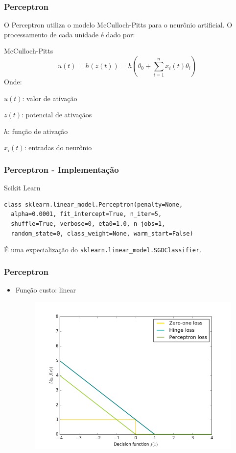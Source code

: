 \documentclass{beamer}
\begin{document}
\begin{frame}
\frametitle{Perceptron}
O Perceptron utiliza o modelo McCulloch-Pitts para o neurônio artificial. O processamento de cada unidade é dado por:
\begin{block}{McCulloch-Pitts}
\[ u(t) = h(z(t)) = h \left( \theta_0 + \sum_{i=1}^n x_i(t) \theta_i \right) \]
Onde:

$u(t)$: valor de ativação

$z(t)$: potencial de ativaçãos

$h$: função de ativação
  
$x_i(t)$: entradas do neurônio
\end{block}
\end{frame}

\begin{frame}[fragile] %
\frametitle{Perceptron - Implementação}
\begin{block}{Scikit Learn}
\begin{verbatim}
class sklearn.linear_model.Perceptron(penalty=None, 
  alpha=0.0001, fit_intercept=True, n_iter=5, 
  shuffle=True, verbose=0, eta0=1.0, n_jobs=1, 
  random_state=0, class_weight=None, warm_start=False)
\end{verbatim}
\end{block}
É uma expecialização do \verb|sklearn.linear_model.SGDClassifier|.
\end{frame}

\begin{frame}
\frametitle{Perceptron}
\begin{itemize}
\item Função custo: linear

\begin{figure}[H]
\centering
  \includegraphics[width=0.8\linewidth]{../img/loss_function.png}
  \label{fig:percep}
\end{figure}%


\end{itemize}
\end{frame}
\end{document}
